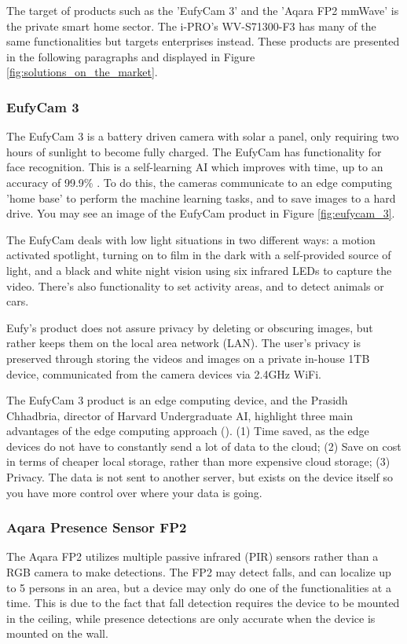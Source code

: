 The target of products such as the 'EufyCam 3' and the 'Aqara FP2 mmWave' is the private smart home sector. The i-PRO's WV-S71300-F3 has many of the same functionalities but targets enterprises instead. These products are presented in the following paragraphs and displayed in Figure \ref{fig:solutions_on_the_market}.

\subsubsection{EufyCam 3}
\label{sec:eufycam}
The EufyCam 3 is a battery driven camera with solar a panel, only requiring two hours of sunlight to become fully charged. The EufyCam has functionality for face recognition. This is a self-learning AI which improves with time, up to an accuracy of 99.9\% \cite{eufycam}. To do this, the cameras communicate to an edge computing 'home base' to perform the machine learning tasks, and to save images to a hard drive. You may see an image of the EufyCam product in Figure \ref{fig:eufycam_3}.

The EufyCam deals with low light situations in two different ways: a motion activated spotlight, turning on to film in the dark with a self-provided source of light, and a black and white night vision using six infrared LEDs to capture the video. There's also functionality to set activity areas, and to detect animals or cars.

Eufy's product does not assure privacy by deleting or obscuring images, but rather keeps them on the local area network (LAN). The user's privacy is preserved through storing the videos and images on a private in-house 1TB device, communicated from the camera devices via 2.4GHz WiFi.

The EufyCam 3 product is an edge computing device, and the Prasidh Chhadbria, director of Harvard Undergraduate AI, highlight three main advantages of the edge computing approach (\citeyear{ch2022youtube_edge_computing_eufycam}). (1) Time saved, as the edge devices do not have to constantly send a lot of data to the cloud; (2) Save on cost in terms of cheaper local storage, rather than more expensive cloud storage; (3) Privacy. The data is not sent to another server, but exists on the device itself so you have more control over where your data is going.

\subsubsection{Aqara Presence Sensor FP2}
The Aqara FP2 utilizes multiple passive infrared (PIR) sensors rather than a RGB camera to make detections. The FP2 may detect falls, and can localize up to 5 persons in an area, but a device may only do one of the functionalities at a time. This is due to the fact that fall detection requires the device to be mounted in the ceiling, while presence detections are only accurate when the device is mounted on the wall.

